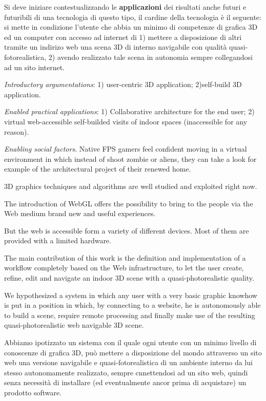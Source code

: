 \documentclass{sigchi}
\begin{document}
Si deve iniziare contestualizzando le {\bf applicazioni} dei risultati anche futuri e futuribili di una tecnologia di questo tipo, il cardine della tecnologia è il seguente: si mette in condizione l'utente che abbia un minimo di competenze di grafica 3D ed un computer con accesso ad internet di 1) mettere a disposizione di altri tramite un indirizo web una scena 3D di interno navigabile con qualità quasi-fotorealistica, 2) avendo realizzato tale scena in autonomia sempre collegandosi ad un sito internet.


{\em Introductory argumentations}: 1) user-centric 3D application; 2)self-build 3D application.



{\em Enabled practical applications}: 1) Collaborative architecture for the end user; 2) virtual web-accessible self-builded visits of indoor spaces (inaccessible for any reason).



{\em Enabling social factors}. Native FPS gamers feel confident moving in a virtual environment in which instead of shoot zombie or aliens, they can take a look for example of the architectural project of their renewed home.


3D graphics techniques and algorithms are well studied and exploited right now. 

The introduction of WebGL offers the possibility to bring to the people via the Web medium brand new and useful experiences.

But the web is accessible form a variety of different devices. Most of them are provided with a limited hardware.



The main contribution of this work is the definition and implementation of a workflow completely based on the Web infrastructure, to let the user create, refine, edit and navigate an indoor 3D scene with a quasi-photorealistic quality.


We hypothesized a system in which any user with a very basic graphic knowhow is put in a position in which, by connecting to a website, he is autonomously able to build a scene, require remote processing and finally make use of the resulting quasi-photorealistic web navigable 3D scene.


Abbiamo ipotizzato un sistema con il quale ogni utente con un minimo livello di conoscenze di grafica 3D, può mettere a disposizione del mondo attraverso un sito web una versione navigabile e quasi-fotorealistica di un ambiente interno da lui stesso autonomamente realizzato, sempre cnnettendosi ad un sito web, quindi senza necessità di installare (ed eventualmente ancor prima di acquistare) un prodotto software.
\end{document}
